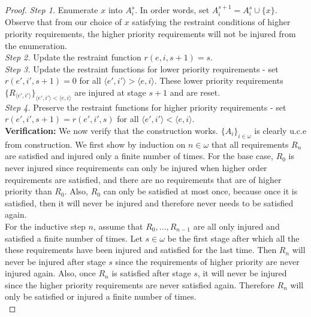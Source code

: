 \documentclass{article}
\begin{document}
\begin{enumerate}[label={(\roman*)}]
\begin{proof}
        \textit{Step 1.} Enumerate $x$ into $A_i^s$. In order words, set
        $A_i^{s+1}=A_i^s\cup\{x\}$. Observe that from our choice of $x$
        satisfying the restraint conditions of higher priority
        requirements, the higher priority requirements will not be injured
        from the enumeration. \\

        \textit{Step 2.} Update the restraint function $r(e,i,s+1)=s$. \\

        \textit{Step 3.} Update the restraint functions for lower priority
        requirements - set $r(e',i',s+1)=0$ for all $\langle e',i'\rangle
        >\langle e,i\rangle$. These lower priority requirements
        $\{R_{\langle e',i'\rangle}\}_{\langle e',i'\rangle <\langle
        e,i\rangle}$ are injured at stage $s+1$ and are reset. \\

        \textit{Step 4.} Preserve the restraint functions for higher
        priority requirements - set $r(e',i',s+1)=r(e',i',s)$ for all
        $\langle e',i'\rangle <\langle e,i\rangle$. \\

        \textbf{Verification:} We now verify that the construction works.
        $\{A_i\}_{i\in\omega}$ is clearly u.c.e from construction. We first
        show by induction on $n\in\omega$ that all
        requirements $R_{n}$ are satisfied and injured
        only a finite number of times. For the base case, $R_0$ is never
        injured since requirements can only be injured when higher order
        requirements are satisfied, and there are no requirements that are
        of higher priority than $R_0$. Also, $R_0$ can only be satisfied at
        most once, because once it is satisfied, then it will never be
        injured and therefore never needs to be satisfied again. \\

        For the inductive step $n$, assume that $R_0,\ldots,R_{n-1}$ are
        all only injured and satisfied a finite number of times. Let
        $s\in\omega$ be the first stage after which all the these
        requirements have been injured and satisfied for the last time.
        Then $R_n$ will never be injured after stage $s$ since the
        requirements of higher priority are never injured again.
        Also, once $R_n$ is satisfied after stage $s$, it will never be
        injured since the higher priority requirements are never satisfied
        again. Therefore $R_n$ will only be satisfied or injured a finite
        number of times. \\


\end{proof}
\end{enumerate}
\end{document}
